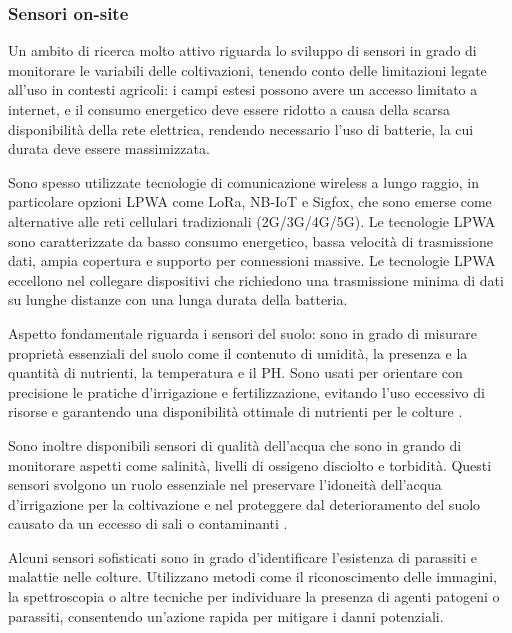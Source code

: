 \documentclass[12pt,a4paper,openright,twoside]{book}
\begin{document}
\subsubsection{Sensori on-site}

Un ambito di ricerca molto attivo riguarda lo sviluppo di sensori in grado di monitorare le variabili delle coltivazioni, tenendo conto delle limitazioni legate all'uso in contesti agricoli: i campi estesi possono avere un accesso limitato a internet, e il consumo energetico deve essere ridotto a causa della scarsa disponibilità della rete elettrica, rendendo necessario l'uso di batterie, la cui durata deve essere massimizzata\cite{s24082647}.

Sono spesso utilizzate tecnologie di comunicazione wireless a lungo raggio, in particolare opzioni \ac{LPWA} come LoRa, NB-IoT e Sigfox, che sono emerse come alternative alle reti cellulari tradizionali (2G/3G/4G/5G)\cite{bhoyar2019communication}.
Le tecnologie LPWA sono caratterizzate da basso consumo energetico, bassa velocità di trasmissione dati, ampia copertura e supporto per connessioni massive. Le tecnologie LPWA eccellono nel collegare dispositivi che richiedono una trasmissione minima di dati su lunghe distanze con una lunga durata della batteria\cite{dai2019low}.

Aspetto fondamentale riguarda i sensori del suolo: sono in grado di misurare proprietà essenziali del suolo come il contenuto di umidità, la presenza e la quantità di nutrienti, la temperatura e il PH. Sono usati per orientare con precisione le pratiche d'irrigazione e fertilizzazione, evitando l'uso eccessivo di risorse e garantendo una disponibilità ottimale di nutrienti per le colture \cite{vuran2018internet}.

Sono inoltre disponibili sensori di qualità dell'acqua che sono in grando di monitorare aspetti come salinità, livelli di ossigeno disciolto e torbidità. Questi sensori svolgono un ruolo essenziale nel preservare l'idoneità dell'acqua d'irrigazione per la coltivazione e nel proteggere dal deterioramento del suolo causato da un eccesso di sali o contaminanti \cite{garcia2020iot}.

Alcuni sensori sofisticati sono in grado d'identificare l'esistenza di parassiti e malattie nelle colture. Utilizzano metodi come il riconoscimento delle immagini, la spettroscopia o altre tecniche per individuare la presenza di agenti patogeni o parassiti, consentendo un'azione rapida per mitigare i danni potenziali\cite{che2022mobile}.
\end{document}
